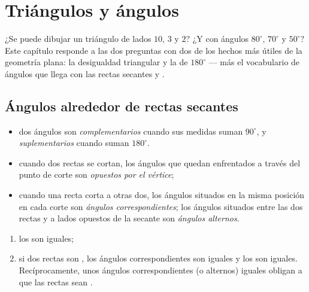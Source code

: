 \chapter{Triángulos y ángulos}\label{ch:g7:triangles}

¿Se puede dibujar un triángulo de lados $10$, $3$ y $2$? ¿Y con ángulos
$80^\circ$, $70^\circ$ y $50^\circ$? Este capítulo responde a las dos
preguntas con dos de los hechos más útiles de la geometría plana: la
desigualdad triangular y la  de $180^\circ$ --- más el vocabulario
de ángulos que llega con las rectas secantes y .

\section{Ángulos alrededor de rectas secantes}

\begin{definition}\label{def:g7:triangles:pairs}
\begin{itemize}
  \item dos ángulos son \emph{complementarios} cuando sus medidas suman
        $90^\circ$, y \emph{suplementarios} cuando suman
        $180^\circ$.
  \item cuando dos rectas se cortan, los ángulos que quedan enfrentados a través del
        punto de corte son \emph{opuestos por el
        vértice};
  \item cuando una recta corta a otras dos, los ángulos situados en la
        misma posición en cada corte son
        \emph{ángulos correspondientes}; los ángulos situados entre las dos rectas y a
        lados opuestos de la secante son \emph{ángulos
        alternos}.
\end{itemize}
\end{definition}

\begin{theorem}\label{thm:g7:triangles:equalities}
\begin{enumerate}
  \item los  son iguales;
  \item si dos rectas son , los ángulos correspondientes son iguales y
        los  son iguales. Recíprocamente, unos ángulos correspondientes
        (o alternos) iguales obligan a que las rectas sean .
\end{enumerate}
\end{theorem}

